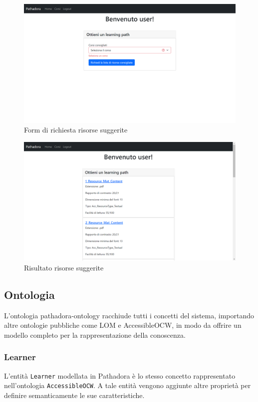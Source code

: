\begin{figure}[H]
\centering
\includegraphics[scale=0.4]{res/resources-generation.png}
\caption{Form di richiesta risorse suggerite}
\label{fig:resources-generation}
\end{figure}

\begin{figure}[H]
\centering
\includegraphics[scale=0.4]{res/path-result.png}
\caption{Risultato risorse suggerite}
\label{fig:resources-generation}
\end{figure}

\subsection{Ontologia}
L’ontologia pathadora-ontology racchiude tutti i concetti del sistema, importando altre ontologie pubbliche come LOM e AccessibleOCW, in modo da offrire un modello completo per la rappresentazione della conoscenza.

\subsubsection{Learner}
L'entità \texttt{Learner} modellata in Pathadora è lo stesso concetto rappresentato nell'ontologia \texttt{AccessibleOCW}. A tale entità vengono aggiunte altre proprietà per definire semanticamente le sue caratteristiche.

